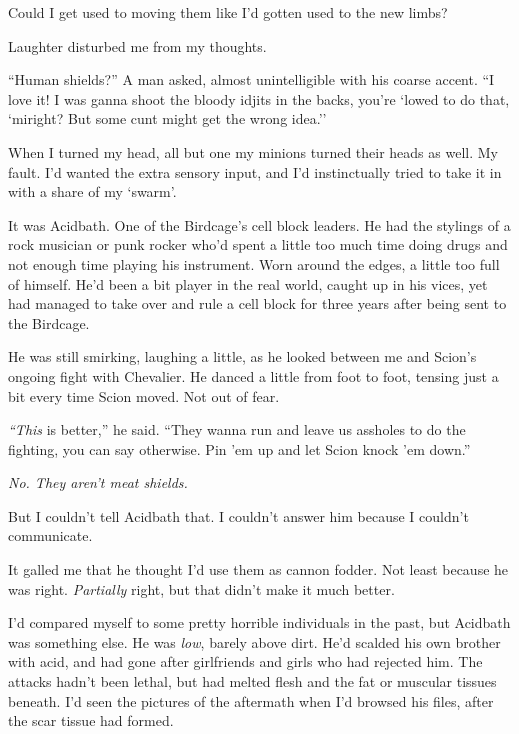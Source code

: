 Could I get used to moving them like I'd gotten used to the new limbs?



Laughter disturbed me from my thoughts.



``Human shields?''  A man asked, almost unintelligible with his coarse accent.  ``I love it!  I was ganna shoot the bloody idjits in the backs, you're `lowed to do that, `miright?  But some cunt might get the wrong idea.''



When I turned my head, all but one my minions turned their heads as well.  My fault.  I'd wanted the extra sensory input, and I'd instinctually tried to take it in with a share of my `swarm'.



It was Acidbath.  One of the Birdcage's cell block leaders.  He had the stylings of a rock musician or punk rocker who'd spent a little too much time doing drugs and not enough time playing his instrument.  Worn around the edges, a little too full of himself.  He'd been a bit player in the real world, caught up in his vices, yet had managed to take over and rule a cell block for three years after being sent to the Birdcage.



He was still smirking, laughing a little, as he looked between me and Scion's ongoing fight with Chevalier.  He danced a little from foot to foot, tensing just a bit every time Scion moved.  Not out of fear.



\emph{``This }is better,'' he said.  ``They wanna run and leave us assholes to do the fighting, you can say otherwise.  Pin 'em up and let Scion knock 'em down.''



\emph{No.  They aren't meat shields.}



But I couldn't tell Acidbath that.  I couldn't answer him because I couldn't communicate.



It galled me that he thought I'd use them as cannon fodder.  Not least because he was right.  \emph{Partially} right, but that didn't make it much better.



I'd compared myself to some pretty horrible individuals in the past, but Acidbath was something else.  He was \emph{low}, barely above dirt.  He'd scalded his own brother with acid, and had gone after girlfriends and girls who had rejected him.  The attacks hadn't been lethal, but had melted flesh and the fat or muscular tissues beneath.  I'd seen the pictures of the aftermath when I'd browsed his files, after the scar tissue had formed.



